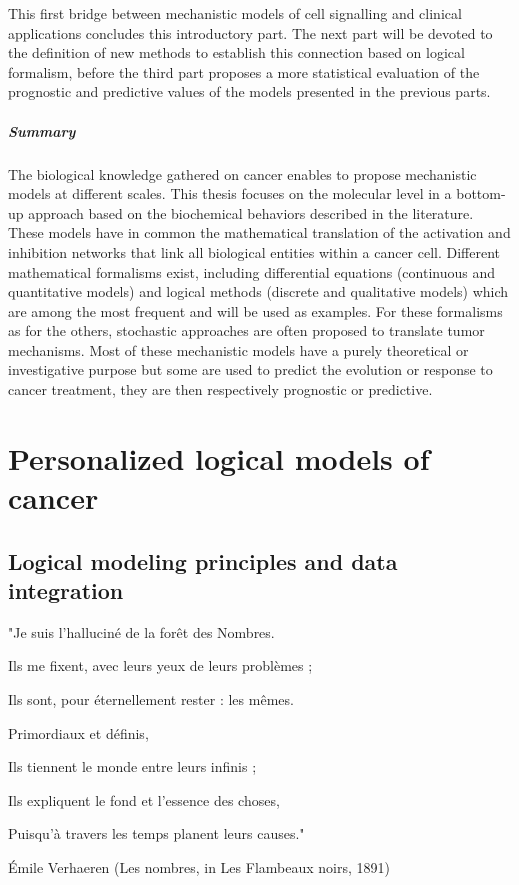 \documentclass[a4paper,12pt,twoside,onecolumn,openright,final,oldfontcommands]{memoir}
\let\BeginKnitrBlock\begin \let\EndKnitrBlock\end
\begin{document}
This first bridge between mechanistic models of cell signalling and
clinical applications concludes this introductory part. The next part
will be devoted to the definition of new methods to establish this
connection based on logical formalism, before the third part proposes a
more statistical evaluation of the prognostic and predictive values of
the models presented in the previous parts.

\BeginKnitrBlock{conclubox}
\subsubsection*{Summary}\label{summary-2}

The biological knowledge gathered on cancer enables to propose
mechanistic models at different scales. This thesis focuses on the
molecular level in a bottom-up approach based on the biochemical
behaviors described in the literature. These models have in common the
mathematical translation of the activation and inhibition networks that
link all biological entities within a cancer cell. Different
mathematical formalisms exist, including differential equations
(continuous and quantitative models) and logical methods (discrete and
qualitative models) which are among the most frequent and will be used
as examples. For these formalisms as for the others, stochastic
approaches are often proposed to translate tumor mechanisms. Most of
these mechanistic models have a purely theoretical or investigative
purpose but some are used to predict the evolution or response to cancer
treatment, they are then respectively prognostic or predictive.
\EndKnitrBlock{conclubox}

\part{Personalized logical models of
cancer}\label{part-personalized-logical-models-of-cancer}

\chapter{Logical modeling principles and data
integration}\label{logical-modeling-principles-and-data-integration}

\epigraph{"Je suis l’halluciné de la forêt des Nombres.

Ils me fixent, avec leurs yeux de leurs problèmes ;

Ils sont, pour éternellement rester : les mêmes.

Primordiaux et définis,

Ils tiennent le monde entre leurs infinis ;

Ils expliquent le fond et l’essence des choses,

Puisqu’à travers les temps planent leurs causes."}{Émile Verhaeren (Les nombres, in Les Flambeaux noirs, 1891)}
\end{document}
